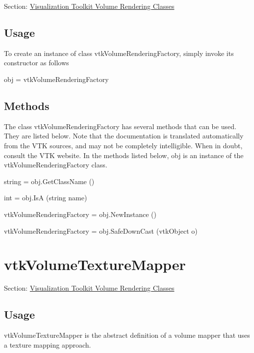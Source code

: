 Section\-: \hyperlink{sec_vtkvolumerendering}{Visualization Toolkit Volume Rendering Classes} \hypertarget{vtkwidgets_vtkxyplotwidget_Usage}{}\subsection{Usage}\label{vtkwidgets_vtkxyplotwidget_Usage}
To create an instance of class vtk\-Volume\-Rendering\-Factory, simply invoke its constructor as follows \begin{DoxyVerb}  obj = vtkVolumeRenderingFactory
\end{DoxyVerb}
 \hypertarget{vtkwidgets_vtkxyplotwidget_Methods}{}\subsection{Methods}\label{vtkwidgets_vtkxyplotwidget_Methods}
The class vtk\-Volume\-Rendering\-Factory has several methods that can be used. They are listed below. Note that the documentation is translated automatically from the V\-T\-K sources, and may not be completely intelligible. When in doubt, consult the V\-T\-K website. In the methods listed below, {\ttfamily obj} is an instance of the vtk\-Volume\-Rendering\-Factory class. 
\begin{DoxyItemize}
\item {\ttfamily string = obj.\-Get\-Class\-Name ()}  
\item {\ttfamily int = obj.\-Is\-A (string name)}  
\item {\ttfamily vtk\-Volume\-Rendering\-Factory = obj.\-New\-Instance ()}  
\item {\ttfamily vtk\-Volume\-Rendering\-Factory = obj.\-Safe\-Down\-Cast (vtk\-Object o)}  
\end{DoxyItemize}\hypertarget{vtkvolumerendering_vtkvolumetexturemapper}{}\section{vtk\-Volume\-Texture\-Mapper}\label{vtkvolumerendering_vtkvolumetexturemapper}
Section\-: \hyperlink{sec_vtkvolumerendering}{Visualization Toolkit Volume Rendering Classes} \hypertarget{vtkwidgets_vtkxyplotwidget_Usage}{}\subsection{Usage}\label{vtkwidgets_vtkxyplotwidget_Usage}
vtk\-Volume\-Texture\-Mapper is the abstract definition of a volume mapper that uses a texture mapping approach.

